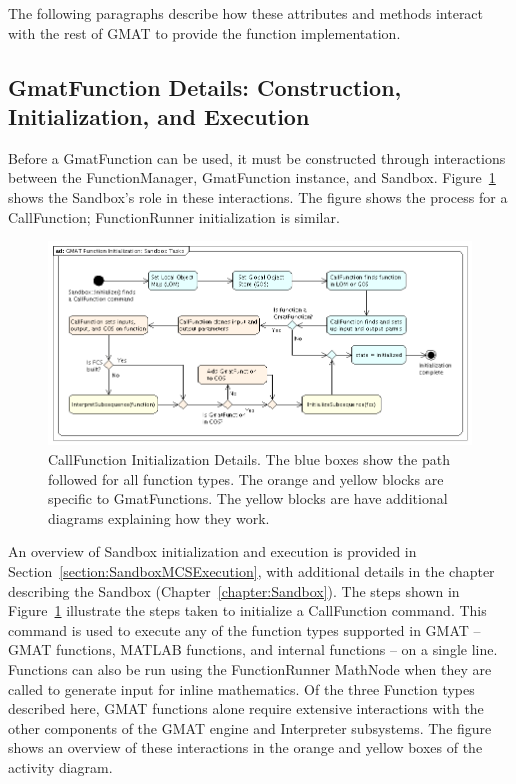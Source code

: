 The following paragraphs describe how these attributes and methods interact with the rest of GMAT
to provide the function implementation.

\subsection{\label{section:GmatFunctionFlow}GmatFunction Details: Construction, Initialization, and
Execution}

Before a GmatFunction can be used, it must be constructed through interactions between the
FunctionManager, GmatFunction instance, and Sandbox. 
Figure~\ref{figure:FunctionInitializationOverview} shows the Sandbox's role in these interactions. 
The figure shows the process for a CallFunction; FunctionRunner initialization is similar.

\begin{figure}[htb]
\begin{center}
\includegraphics[427,206]{Images/GMATFunctionInitializationSandboxTasks.png}
\caption[CallFunction Initialization
Details]{\label{figure:FunctionInitializationOverview}CallFunction Initialization Details.  The blue
boxes show the path followed for all function types.  The orange and yellow blocks are specific to
GmatFunctions.  The yellow blocks are have additional diagrams explaining how they work.}
\end{center}
\end{figure}

An overview of Sandbox initialization and execution is provided in
Section~\ref{section:SandboxMCSExecution}, with additional details in the chapter describing the
Sandbox (Chapter~\ref{chapter:Sandbox}).  The steps shown in
Figure~\ref{figure:FunctionInitializationOverview} illustrate the steps taken to initialize a
CallFunction command.  This command is used to execute any of the function types supported in GMAT
-- GMAT functions, MATLAB functions, and internal functions -- on a single line.  Functions can
also be run using the FunctionRunner MathNode when they are called to generate input for inline
mathematics.  Of the three Function types described here, GMAT functions alone require extensive
interactions with the other components of the GMAT engine and Interpreter subsystems.  The figure
shows an overview of these interactions in the orange and yellow boxes of the activity diagram.

